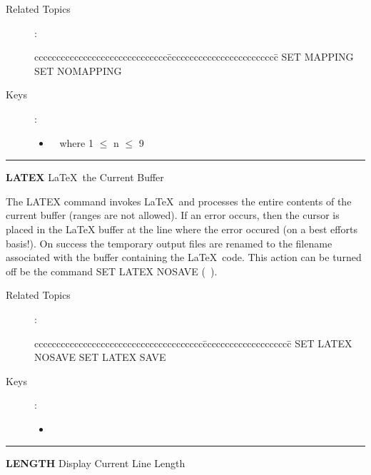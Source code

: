 \begin{description}
\item[Related Topics]:
\begin{tabbing}
cccccccccccccccccccccccccccccc\=ccccccccccccccccccccccccc\=\kill
SET MAPPING  \> SET NOMAPPING \\
\end{tabbing}

\item[Keys]:
          \begin{itemize}
          \item \gold\  where 1 $\leq$ n $\leq$ 9
          \end{itemize}

\end{description}

\goodbreak

\rule{\textwidth}{0.3mm}

{\Large {\bf LATEX} \hfill \LaTeX\ the Current Buffer}

\medskip
  The LATEX command invokes \LaTeX\ and processes the entire contents
  of the current buffer (ranges are not allowed). If an error occurs,
  then the cursor is placed in the LaTeX buffer at the line where the
  error occured (on a best efforts basis!). On success the temporary output
  files are renamed to the filename associated with the buffer containing the
  \LaTeX\ code. This action can be turned off be the command SET LATEX NOSAVE
  (\gold\ ).

\begin{description}
\item[Related Topics]:
\begin{tabbing}
cccccccccccccccccccccccccccccccccccccc\=cccccccccccccccccccc\=\kill
SET LATEX NOSAVE    \> SET LATEX SAVE \\
\end{tabbing}

\item[Keys]:
          \begin{itemize}
          \item {}\ 
          \end{itemize}

\end{description}

\goodbreak

\rule{\textwidth}{0.3mm}

{\Large {\bf LENGTH} \hfill Display Current Line Length}


